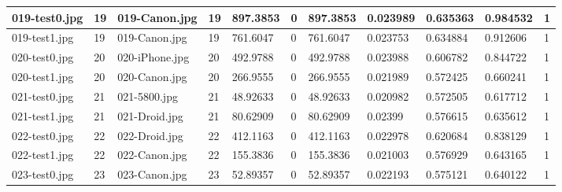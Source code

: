 \begin{landscape}
\begin{longtable}{|p{2cm}|p{1cm}|p{2cm}|p{1cm}|p{2cm}|p{1cm}|p{2cm}|p{2cm}|p{2cm}|p{2cm}|p{1cm}|}
		019-test0.jpg   & 19               & 019-Canon.jpg         & 19                          & 897.3853              & 0                       & 897.3853                   & 0.023989              & 0.635363              & 0.984532                 & 1                \\ \hline
		019-test1.jpg   & 19               & 019-Canon.jpg         & 19                          & 761.6047              & 0                       & 761.6047                   & 0.023753              & 0.634884              & 0.912606                 & 1                \\ \hline
		020-test0.jpg   & 20               & 020-iPhone.jpg        & 20                          & 492.9788              & 0                       & 492.9788                   & 0.023988              & 0.606782              & 0.844722                 & 1                \\ \hline
		020-test1.jpg   & 20               & 020-Canon.jpg         & 20                          & 266.9555              & 0                       & 266.9555                   & 0.021989              & 0.572425              & 0.660241                 & 1                \\ \hline
		021-test0.jpg   & 21               & 021-5800.jpg          & 21                          & 48.92633              & 0                       & 48.92633                   & 0.020982              & 0.572505              & 0.617712                 & 1                \\ \hline
		021-test1.jpg   & 21               & 021-Droid.jpg         & 21                          & 80.62909              & 0                       & 80.62909                   & 0.02399               & 0.576615              & 0.635612                 & 1                \\ \hline
		022-test0.jpg   & 22               & 022-Droid.jpg         & 22                          & 412.1163              & 0                       & 412.1163                   & 0.022978              & 0.620684              & 0.838129                 & 1                \\ \hline
		022-test1.jpg   & 22               & 022-Canon.jpg         & 22                          & 155.3836              & 0                       & 155.3836                   & 0.021003              & 0.576929              & 0.643165                 & 1                \\ \hline
		023-test0.jpg   & 23               & 023-Canon.jpg         & 23                          & 52.89357              & 0                       & 52.89357                   & 0.022193              & 0.575121              & 0.640122                 & 1                \\ \hline

\end{longtable}
\end{landscape}
